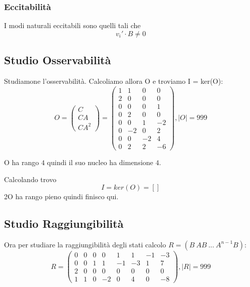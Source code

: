 \documentclass{article}
\begin{document}
\subsubsection{Eccitabilità}
 I modi naturali eccitabili sono quelli tali che 
\[v_i' \cdot B \neq 0\]

\subsection{Studio Osservabilità}

Studiamone l’osservabilità. Calcoliamo allora O e troviamo I = ker(O):
\[
 O = \begin{pmatrix}C \\ CA \\ CA^2 \end{pmatrix} = \left(\begin{matrix}1 & 1 & 0 & 0\\2 & 0 & 0 & 0\\0 & 0 & 0 & 1\\0 & 2 & 0 & 0\\0 & 0 & 1 & -2\\0 & -2 & 0 & 2\\0 & 0 & -2 & 4\\0 & 2 & 2 & -6\end{matrix}\right), |O| = 999 \]

O ha rango $ 4 $ quindi il suo nucleo ha dimensione $ 4 $.

Calcolando trovo \[ 
I = ker(O) = \left[ \right]\]
2O ha rango pieno quindi finisco qui.

\subsection{Studio Raggiungibilità}
Ora per studiare la raggiungibilità degli stati calcolo $R = (B\ AB\ ...\ A^{n-1}B)$: \[ R = \left(\begin{matrix}0 & 0 & 0 & 0 & 1 & 1 & -1 & -3\\0 & 0 & 1 & 1 & -1 & -3 & 1 & 7\\2 & 0 & 0 & 0 & 0 & 0 & 0 & 0\\1 & 1 & 0 & -2 & 0 & 4 & 0 & -8\end{matrix}\right), |R| = 999 \] 
\end{document}
